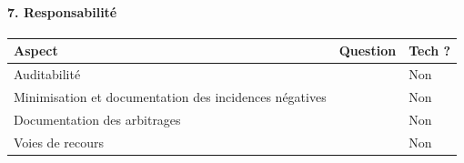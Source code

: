 \documentclass[10pt, french, a4paper]{report}
\begin{document}
\paragraph{7. Responsabilité}

\begin{center}
  \begin{tabular}{ |p{4cm}|p{6cm}|p{2cm}| } 
    \hline
    Aspect & Question & Tech ? \\
    \hline
    \hline
    Auditabilité &  & Non \\
    \hline
    Minimisation et documentation des incidences négatives &  & Non \\
    \hline
    Documentation des arbitrages &  & Non \\
    \hline
    Voies de recours &  & Non \\
    \hline
    
  \end{tabular}
\end{center}
\end{document}

